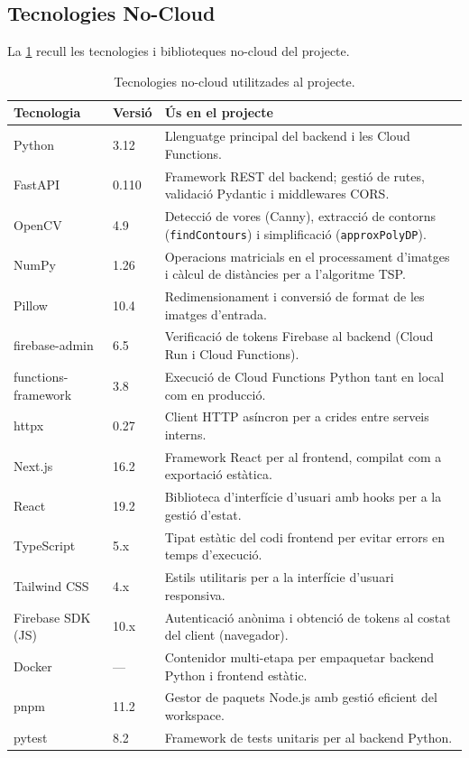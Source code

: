 \subsection{Tecnologies No-Cloud}

La \cref{tab:nocloud} recull les tecnologies i biblioteques no-cloud del projecte.

\begin{table}[H]
\centering
\caption{Tecnologies no-cloud utilitzades al projecte.}
\label{tab:nocloud}
\begin{tabularx}{\linewidth}{p{4.2cm}lX}
\toprule
\textbf{Tecnologia} & \textbf{Versió} & \textbf{Ús en el projecte} \\
\midrule
Python & 3.12 & Llenguatge principal del backend i les Cloud Functions. \\[3pt]
FastAPI~\cite{fastapi} & 0.110 & Framework REST del backend; gestió de rutes, validació Pydantic i middlewares CORS. \\[3pt]
OpenCV~\cite{opencv} & 4.9 & Detecció de vores (Canny), extracció de contorns (\texttt{findContours}) i simplificació (\texttt{approxPolyDP}). \\[3pt]
NumPy~\cite{numpy} & 1.26 & Operacions matricials en el processament d'imatges i càlcul de distàncies per a l'algoritme TSP. \\[3pt]
Pillow & 10.4 & Redimensionament i conversió de format de les imatges d'entrada. \\[3pt]
firebase-admin & 6.5 & Verificació de tokens Firebase al backend (Cloud Run i Cloud Functions). \\[3pt]
functions-framework & 3.8 & Execució de Cloud Functions Python tant en local com en producció. \\[3pt]
httpx & 0.27 & Client HTTP asíncron per a crides entre serveis interns. \\[3pt]
Next.js~\cite{nextjs} & 16.2 & Framework React per al frontend, compilat com a exportació estàtica. \\[3pt]
React~\cite{react} & 19.2 & Biblioteca d'interfície d'usuari amb hooks per a la gestió d'estat. \\[3pt]
TypeScript & 5.x & Tipat estàtic del codi frontend per evitar errors en temps d'execució. \\[3pt]
Tailwind CSS~\cite{tailwind} & 4.x & Estils utilitaris per a la interfície d'usuari responsiva. \\[3pt]
Firebase SDK (JS) & 10.x & Autenticació anònima i obtenció de tokens al costat del client (navegador). \\[3pt]
Docker & — & Contenidor multi-etapa per empaquetar backend Python i frontend estàtic. \\[3pt]
pnpm & 11.2 & Gestor de paquets Node.js amb gestió eficient del workspace. \\[3pt]
pytest & 8.2 & Framework de tests unitaris per al backend Python. \\
\bottomrule
\end{tabularx}
\end{table}

